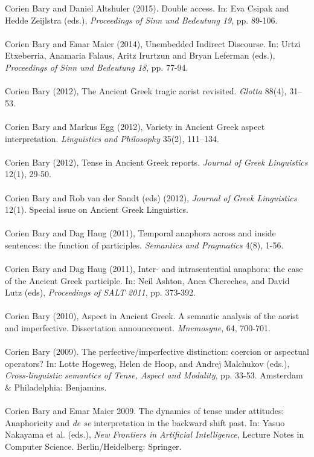 \documentclass[a4paper,11pt]{article}
\begin{document}
Corien Bary and Daniel Altshuler (2015). Double access. In: Eva Csipak and Hedde Zeijlstra (eds.), \emph{Proceedings of Sinn und Bedeutung 19}, pp. 89-106.\\\\
Corien Bary and Emar Maier (2014), Unembedded Indirect Discourse. In: Urtzi Etxeberria, Anamaria Falaus, Aritz Irurtzun and Bryan Leferman (eds.), \emph{Proceedings of Sinn und Bedeutung 18}, pp. 77-94.\\\\
Corien Bary (2012), The Ancient Greek tragic aorist revisited. \emph{Glotta} 88(4), 31--53.\\\\
Corien Bary and Markus Egg (2012), Variety in Ancient Greek aspect interpretation. \emph{Linguistics and Philosophy} 35(2), 111--134.\\\\
Corien Bary (2012), Tense in Ancient Greek reports. \emph{Journal of Greek Linguistics} 12(1), 29-50.\\\\
Corien Bary and Rob van der Sandt (eds) (2012), \emph{Journal of Greek Linguistics} 12(1). Special issue on Ancient Greek Linguistics.\\\\
Corien Bary and Dag Haug (2011), Temporal anaphora across and inside sentences: the function of participles. \emph{Semantics and Pragmatics} 4(8), 1-56.\\\\
Corien Bary and Dag Haug (2011), Inter- and intrasentential anaphora: the case of the Ancient Greek participle. In: Neil Ashton, Anca Chereches, and David Lutz (eds), \emph{Proceedings of SALT 2011}, pp. 373-392.\\\\
Corien Bary (2010), Aspect in Ancient Greek. A semantic analysis of the aorist and imperfective. Dissertation announcement. \emph{Mnemosyne}, 64, 700-701.\\\\
Corien Bary (2009). The perfective/imperfective distinction: coercion or aspectual operators? In: Lotte Hogeweg, Helen de Hoop, and Andrej Malchukov (eds.), \emph{Cross-linguistic semantics of Tense, Aspect and Modality}, pp. 33-53. Amsterdam \& Philadelphia: Benjamins.\\\\ 
Corien Bary and Emar Maier 2009. The dynamics of tense under attitudes: Anaphoricity and \emph{de se} interpretation in the backward shift past. In: Yasuo Nakayama et al. (eds.), \emph{New Frontiers in Artificial Intelligence}, Lecture Notes in Computer Science. Berlin/Heidelberg: Springer.\\\\ 
\end{document}

